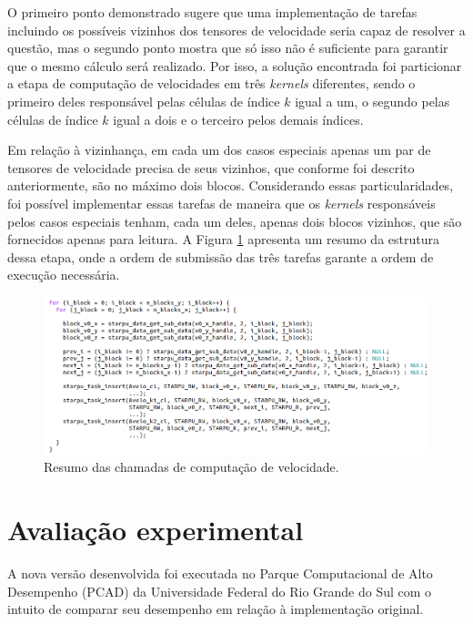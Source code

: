 \documentclass[cic,tc]{iiufrgs}
\begin{document}
O primeiro ponto demonstrado sugere que uma implementação de tarefas incluindo os possíveis vizinhos dos tensores de velocidade
seria capaz de resolver a questão, mas o segundo ponto mostra que só isso não é suficiente para garantir que o mesmo cálculo será
realizado. Por isso, a solução encontrada foi particionar a etapa de computação de velocidades em três \textit{kernels} diferentes, sendo
o primeiro deles responsável pelas células de índice $k$ igual a um, o segundo pelas células de índice $k$ igual a dois e o terceiro pelos
demais índices.

Em relação à vizinhança, em cada um dos casos especiais apenas um par de tensores de velocidade precisa de seus vizinhos, que conforme
foi descrito anteriormente, são no máximo dois blocos. Considerando essas particularidades, foi possível implementar essas tarefas de
maneira que os \textit{kernels} responsáveis pelos casos especiais tenham, cada um deles, apenas dois blocos vizinhos, que são fornecidos
apenas para leitura. A Figura \ref{fig:kernels_velo} apresenta um resumo da estrutura dessa etapa, onde a ordem de submissão das três
tarefas garante a ordem de execução necessária.

\begin{figure}[!htb]
  \caption{Resumo das chamadas de computação de velocidade.}
    \begin{center} 
      \includegraphics[width=35em]{kernels_velo}
    \end{center}
    \label{fig:kernels_velo}
\end{figure}


\chapter{Avaliação experimental}

A nova versão desenvolvida foi executada no Parque Computacional de Alto Desempenho (PCAD) da Universidade Federal do Rio Grande do Sul com o
intuito de comparar seu desempenho em relação à implementação original.
\end{document}
